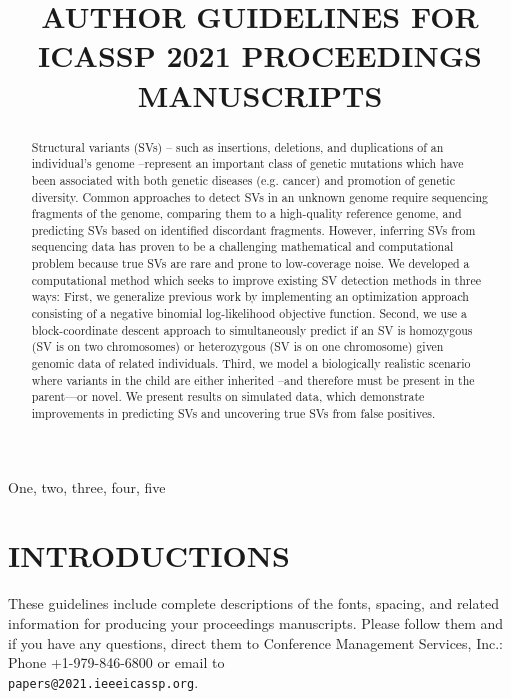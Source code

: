 \documentclass{article}
\title{AUTHOR GUIDELINES FOR ICASSP 2021 PROCEEDINGS MANUSCRIPTS}
\begin{document}
	\ninept
	\maketitle
	\begin{abstract}
Structural variants (SVs) -- such as insertions, deletions, and duplications of an individual’s genome --represent an important class of genetic mutations which have been associated with both genetic diseases (e.g. cancer) and promotion of genetic diversity. Common approaches to detect SVs in an unknown genome require sequencing fragments of the genome, comparing them to a high-quality reference genome, and predicting SVs based on identified discordant fragments. However, inferring SVs from sequencing data has proven to be a challenging mathematical and computational problem because true SVs are rare and prone to low-coverage noise. We developed a computational method which seeks to improve existing SV detection methods in three ways: First, we generalize previous work by implementing an optimization approach consisting of a negative binomial log-likelihood objective function. Second, we use a block-coordinate descent approach to simultaneously predict if an SV is homozygous (SV is on two chromosomes) or heterozygous (SV is on one chromosome) given genomic data of related individuals. Third, we model a biologically realistic scenario where variants in the child are either inherited –and therefore must be present in the parent—or novel. We present results on simulated data, which demonstrate improvements in predicting SVs and uncovering true SVs from false positives. 
	\end{abstract}
	\begin{keywords}
		One, two, three, four, five
	\end{keywords}
	\section{INTRODUCTIONS}
	\label{sec:intro}
	
	These guidelines include complete descriptions of the fonts, spacing, and
	related information for producing your proceedings manuscripts. Please follow
	them and if you have any questions, direct them to Conference Management
	Services, Inc.: Phone +1-979-846-6800 or email
	to \\\texttt{papers@2021.ieeeicassp.org}.
	
\end{document}
